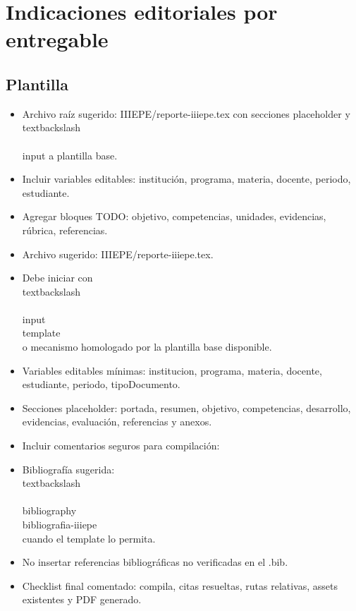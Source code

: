 \documentclass[12pt]{article}
\begin{document}
\section*{Indicaciones editoriales por entregable}

\subsection*{Plantilla}
\begin{itemize}[leftmargin=*]
  \item Archivo raíz sugerido: IIIEPE/reporte-iiiepe.tex con secciones placeholder y \\textbackslash\\{\\}input a plantilla base.
  \item Incluir variables editables: institución, programa, materia, docente, periodo, estudiante.
  \item Agregar bloques TODO: objetivo, competencias, unidades, evidencias, rúbrica, referencias.
  \item Archivo sugerido: IIIEPE/reporte-iiiepe.tex.
  \item Debe iniciar con \\textbackslash\\{\\}input\\{template\\} o mecanismo homologado por la plantilla base disponible.
  \item Variables editables mínimas: institucion, programa, materia, docente, estudiante, periodo, tipoDocumento.
  \item Secciones placeholder: portada, resumen, objetivo, competencias, desarrollo, evidencias, evaluación, referencias y anexos.
  \item Incluir comentarios seguros para compilación: \\%
  \item Bibliografía sugerida: \\textbackslash\\{\\}bibliography\\{bibliografia-iiiepe\\} cuando el template lo permita.
  \item No insertar referencias bibliográficas no verificadas en el .bib.
  \item Checklist final comentado: compila, citas resueltas, rutas relativas, assets existentes y PDF generado.

\end{itemize}
\end{document}
